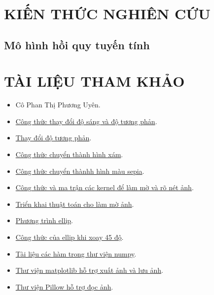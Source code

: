 \documentclass{report}
\begin{document}
\section{KIẾN THỨC NGHIÊN CỨU}
\subsection{Mô hình hồi quy tuyến tính}
\section{TÀI LIỆU THAM KHẢO}
\begin{itemize}
    \item Cô Phan Thị Phương Uyên.
    \item 
    \href{https://ie.nitk.ac.in/blog/2020/01/19/algorithms-for-adjusting-brightness-and-contrast-of-an-image/}{Công thức thay đổi độ sáng và độ tương phản}.

    \item
    \href{https://www.dfstudios.co.uk/articles/programming/image-programming-algorithms/image-processing-algorithms-part-5-contrast-adjustment/}{Thay đổi độ tương phản}.

    \item 
    \href{https://www.baeldung.com/cs/convert-rgb-to-grayscale}{Công thức chuyển thành hình xám}.

    \item 
    \href{https://dyclassroom.com/image-processing-project/how-to-convert-a-color-image-into-sepia-image}{Công thức chuyển thànhh hình màu sepia}.

    \item \href{https://en.wikipedia.org/wiki/Kernel_(image_processing)}{Công thức và ma trận các kernel để làm mờ và rõ nét ảnh}.

    \item 
    \href{https://www.youtube.com/watch?v=4Eh0y3LHTNU&t=658s}{Triển khai thuật toán cho làm mờ ảnh}.
    \item \href{https://www.maa.org/external_archive/joma/Volume8/Kalman/General.html}{Phương trình ellip}.

    \item \href{https://math.stackexchange.com/questions/2003517/how-to-calculate-width-and-height-of-a-45-rotated-ellipse-bounded-by-a-square}{Công thức của ellip khi xoay 45 độ}.

    \item \href{https://numpy.org/doc/stable/user/index.html#user}{Tài liệu các hàm trong thư viện numpy}.

    \item \href{https://matplotlib.org/stable/api/_as_gen/matplotlib.pyplot.imshow.html}{Thư viện matplotlib hỗ trợ xuất ảnh và lưu ảnh}.

    \item \href{https://pillow.readthedocs.io/en/stable/reference/Image.html}{Thư viện Pillow hỗ trợ đọc ảnh}.
    
\end{itemize}
\end{document}
